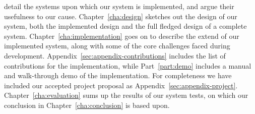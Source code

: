 detail the systems upon which our system is implemented, and argue their
usefulness to our cause.
Chapter~\ref{cha:design} sketches out the design of our system, both 
the implemented design and the full fledged design of a complete system.
Chapter~\ref{cha:implementation} goes on to describe the extend of our
implemented system, along with some of the core challenges faced during development.
Appendix~\ref{sec:appendix-contributions} includes the list of contributions
for the implementation,
while Part~\ref{part:demo} includes a manual and walk-through demo of the implementation.
For completeness we have included our accepted project proposal as
Appendix~\ref{sec:appendix-project}.
Chapter~\ref{cha:evaluation} sums up the results of our system tests,
on which our conclusion in Chapter~\ref{cha:conclusion} is based upon.
